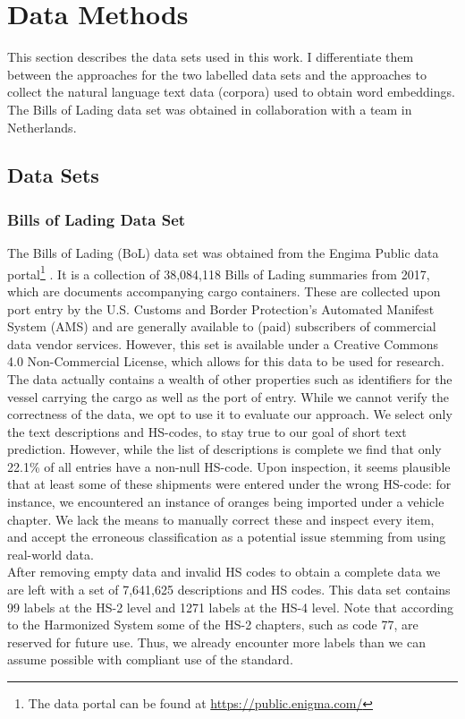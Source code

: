 \chapter{Data Methods}

This section describes the data sets used in this work. I differentiate them between the approaches for the two labelled data sets and the approaches to collect the natural language text data (corpora) used to obtain word embeddings.
The Bills of Lading data set was obtained in collaboration with a team in Netherlands.

\section{Data Sets}
\subsection{Bills of Lading Data Set}
The Bills of Lading (BoL) data set was obtained from the Engima Public data portal\footnote{The data portal can be found at \url{https://public.enigma.com/}} . It is a collection of 38,084,118 Bills of Lading summaries from 2017, which are documents accompanying cargo containers. These are collected upon port entry by the U.S. Customs and Border Protection’s Automated Manifest System (AMS) and are generally available to (paid) subscribers of commercial data vendor services. However, this set is available under a Creative Commons 4.0 Non-Commercial License, which allows for this data to be used for research. The data actually contains a wealth of other properties such as identifiers for the vessel carrying the cargo as well as the port of entry. While we cannot verify the correctness of the data, we opt to use it to evaluate our approach. We select only the text descriptions and HS-codes, to stay true to our goal of short text prediction. However, while the list of descriptions is complete we find that only 22.1{\%} of all entries have a non-null HS-code. Upon inspection, it seems plausible that at least some of these shipments were entered under the wrong HS-code: for instance, we encountered an instance of oranges being imported under a vehicle chapter. We lack the means to manually correct these and inspect every item, and accept the erroneous classification as a potential issue stemming from using real-world data. \\
After removing empty data and invalid HS codes to obtain a complete data we are left with a set of 7,641,625 descriptions and HS codes. This data set contains 99 labels at the HS-2 level and 1271 labels at the HS-4 level. Note that according to the Harmonized System some of the HS-2 chapters, such as code 77, are reserved for future use. Thus, we already encounter more labels than we can assume possible with compliant use of the standard.
